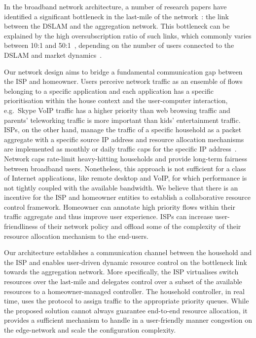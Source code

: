 In the broadband network architecture, a number of research papers have
identified a significant bottleneck in the last-mile of the
network~\cite{Dischinger:2007bg,Akella2003}: the link between the DSLAM and the
aggregation network. This bottleneck can be explained by the high
oversubscription ratio of such links, which commonly varies 
between 10:1 and 50:1~\cite{canada-subscription}, depending on the
number of users connected to the DSLAM and market
dynamics~\cite{sky-oversubscription}.  

Our network design aims to bridge a fundamental communication gap between the
ISP and homeowner. Users perceive network traffic as an ensemble of flows
belonging to a specific application and each application has a specific
prioritisation within the house context and the user-computer interaction,
e.g.~Skype VoIP traffic has a higher priority than web browsing traffic and
parents' teleworking traffic is more important than kids' entertainment traffic.
ISPs, on the other hand, manage the traffic of a specific household as a packet
aggregate with a specific source IP address and resource allocation mechanisms
are implemented as monthly or daily traffic caps for the specific IP
address~\cite{virgin-caps,bt-caps}.  Network caps  rate-limit heavy-hitting
households and provide long-term fairness between broadband users. Nonetheless,
this approach is not sufficient for a class of Internet applications, like
remote desktop and VoIP, for which performance is not tightly coupled with the
available bandwidth. We believe that there is an incentive
for the ISP and homeowner entities to establish a collaborative resource control
framework. Homeowner can annotate high priority flows within their traffic
aggregate and thus improve user experience. ISPs can increase user-friendliness
of their network policy and offload some of the complexity of their resource
allocation mechanism to the end-users. 

Our architecture establishes a communication channel between the household and
the ISP and enables user-driven dynamic resource control on the bottleneck
link towards the aggregation network. More specifically, the ISP virtualises
switch resources over the last-mile and delegates control over a subset of the
available resources to a homeowner-managed \of controller.  The household
controller, in real time, uses the \of protocol to assign traffic to the
appropriate priority queues.  While the proposed solution cannot always
guarantee end-to-end resource allocation, it provides a sufficient mechanism to
handle in a user-friendly manner congestion on the edge-network and scale the
configuration complexity. 


